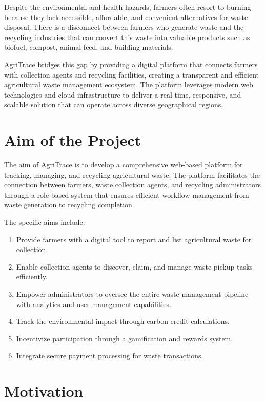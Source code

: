 \documentclass[a4paper,12pt,oneside]{report}
\let\originalitem\item
\renewcommand{\item}{\Needspace{10\baselineskip}\originalitem}
\begin{document}
Despite the environmental and health hazards, farmers often resort to burning because they lack accessible, affordable, and convenient alternatives for waste disposal. There is a disconnect between farmers who generate waste and the recycling industries that can convert this waste into valuable products such as biofuel, compost, animal feed, and building materials.

AgriTrace bridges this gap by providing a digital platform that connects farmers with collection agents and recycling facilities, creating a transparent and efficient agricultural waste management ecosystem. The platform leverages modern web technologies and cloud infrastructure to deliver a real-time, responsive, and scalable solution that can operate across diverse geographical regions.

\section{Aim of the Project}

\noindent The aim of AgriTrace is to develop a comprehensive web-based platform for tracking, managing, and recycling agricultural waste. The platform facilitates the connection between farmers, waste collection agents, and recycling administrators through a role-based system that ensures efficient workflow management from waste generation to recycling completion.

The specific aims include:
\begin{enumerate}
    \item Provide farmers with a digital tool to report and list agricultural waste for collection.
    \item Enable collection agents to discover, claim, and manage waste pickup tasks efficiently.
    \item Empower administrators to oversee the entire waste management pipeline with analytics and user management capabilities.
    \item Track the environmental impact through carbon credit calculations.
    \item Incentivize participation through a gamification and rewards system.
    \item Integrate secure payment processing for waste transactions.
\end{enumerate}

\section{Motivation}
\end{document}
